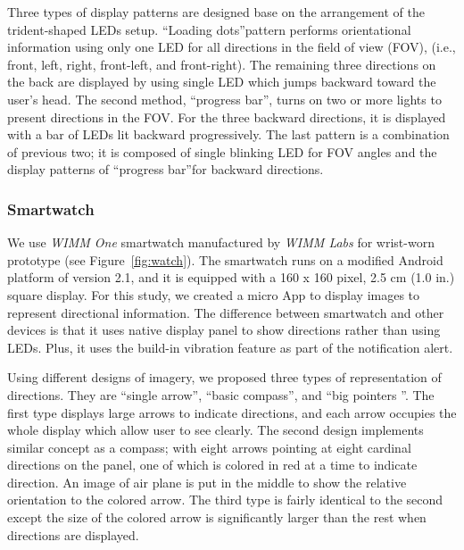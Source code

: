 \documentclass{sigchi}
\begin{document}
Three types of display patterns are designed base on the arrangement of the trident-shaped LEDs setup. \textquotedblleft Loading dots\textquotedblright pattern performs orientational information using only one LED for all directions in the field of view (FOV), (i.e., front, left, right, front-left, and front-right). The remaining three directions on the back are displayed by using single LED which jumps backward toward the user's head. The second method, \textquotedblleft progress bar\textquotedblright, turns on two or more lights to present directions in the FOV. For the three backward directions, it is displayed with a bar of LEDs lit backward progressively. The last pattern is a combination of previous two; it is composed of single blinking LED for FOV angles and the display patterns of \textquotedblleft progress bar\textquotedblright for backward directions.

\subsubsection{Smartwatch}
We use \textit{WIMM One} smartwatch manufactured by \textit{WIMM Labs} for wrist-worn prototype (see Figure~\ref{fig:watch}). The smartwatch runs on a modified Android platform of version 2.1, and it is equipped with a 160 x 160 pixel, 2.5 cm (1.0 in.) square display. For this study, we created a micro App to display images to represent directional information. The difference between smartwatch and other devices is that it uses native display panel to show directions rather than using LEDs. Plus, it uses the build-in vibration feature as part of the notification alert.

Using different designs of imagery, we proposed three types of representation of directions. They are \textquotedblleft single arrow\textquotedblright, \textquotedblleft basic compass\textquotedblright, and \textquotedblleft big pointers \textquotedblright. The first type displays large arrows to indicate directions, and each arrow occupies the whole display which allow user to see clearly. The second design implements similar concept as a compass; with eight arrows pointing at eight cardinal directions on the panel, one of which is colored in red at a time   to indicate direction. An image of air plane is put in the middle to show the relative orientation to the colored arrow. The third type is fairly identical to the second except the size of the colored arrow is significantly larger than the rest when directions are displayed.
\end{document}

